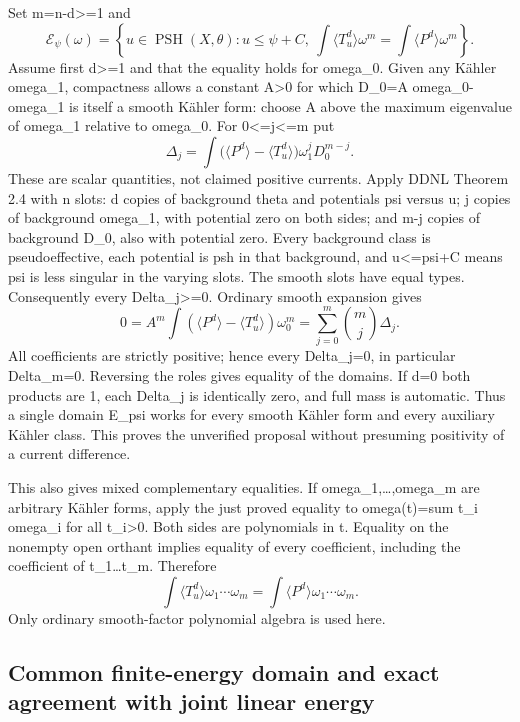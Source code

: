 \documentclass[
]{article}
\begin{document}
Set m=n-d\textgreater=1 and \[
\mathcal E_\psi(\omega)=\left\{u\in\operatorname{PSH}(X,\theta):u\leq\psi+C,
\ \int\langle T_u^d\rangle\omega^m=\int\langle P^d\rangle\omega^m\right\}.
\] Assume first d\textgreater=1 and that the equality holds for
omega\_0. Given any Kähler omega\_1, compactness allows a constant
A\textgreater0 for which D\_0=A omega\_0-omega\_1 is itself a smooth
Kähler form: choose A above the maximum eigenvalue of omega\_1 relative
to omega\_0. For 0\textless=j\textless=m put \[
\Delta_j=\int\big(\langle P^d\rangle-\langle T_u^d\rangle\big)
\omega_1^j D_0^{m-j}.
\] These are scalar quantities, not claimed positive currents. Apply
DDNL Theorem 2.4 with n slots: d copies of background theta and
potentials psi versus u; j copies of background omega\_1, with potential
zero on both sides; and m-j copies of background D\_0, also with
potential zero. Every background class is pseudoeffective, each
potential is psh in that background, and u\textless=psi+C means psi is
less singular in the varying slots. The smooth slots have equal types.
Consequently every Delta\_j\textgreater=0. Ordinary smooth expansion
gives \[
0=A^m\int(\langle P^d\rangle-\langle T_u^d\rangle)\omega_0^m
=\sum_{j=0}^m\binom mj\Delta_j.
\] All coefficients are strictly positive; hence every Delta\_j=0, in
particular Delta\_m=0. Reversing the roles gives equality of the
domains. If d=0 both products are 1, each Delta\_j is identically zero,
and full mass is automatic. Thus a single domain E\_psi works for every
smooth Kähler form and every auxiliary Kähler class. This proves the
unverified proposal without presuming positivity of a current
difference.

This also gives mixed complementary equalities. If
omega\_1,\ldots,omega\_m are arbitrary Kähler forms, apply the just
proved equality to omega(t)=sum t\_i omega\_i for all t\_i\textgreater0.
Both sides are polynomials in t. Equality on the nonempty open orthant
implies equality of every coefficient, including the coefficient of
t\_1\ldots t\_m. Therefore \[
\int\langle T_u^d\rangle\omega_1\cdots\omega_m
=\int\langle P^d\rangle\omega_1\cdots\omega_m.\tag{5}
\] Only ordinary smooth-factor polynomial algebra is used here.

\subsection{Common finite-energy domain and exact agreement with joint
linear
energy}\label{common-finite-energy-domain-and-exact-agreement-with-joint-linear-energy}
\end{document}
